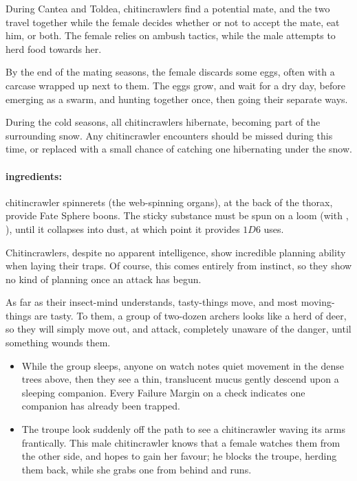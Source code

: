 \begin{multicols}{2}
During \gls{Cantea} and \gls{Toldea}, chitincrawlers find a potential mate, and the two travel together while the female decides whether or not to accept the mate, eat him, or both.
The female relies on ambush tactics, while the male attempts to herd food towards her.

By the end of the mating seasons, the female discards some eggs, often with a carcase wrapped up next to them.
The eggs grow, and wait for a dry day, before emerging as a swarm, and hunting together once, then going their separate ways.

\crawlerSwarm

During the cold seasons, all chitincrawlers hibernate, becoming part of the surrounding snow.
Any chitincrawler encounters should be missed during this time, or replaced with a small chance of catching one hibernating under the snow.

\paragraph{\Glspl{ingredient}:}
chitincrawler spinnerets (the web-spinning organs), at the back of the thorax, provide Fate Sphere \glspl{boon}.
The sticky substance must be spun on a loom (with , \tn[10]), until it collapses into dust, at which point it provides $1D6$ uses.

\showEnc\label{chitin:tactics}
Chitincrawlers, despite no apparent intelligence, show incredible planning ability when laying their traps.
Of course, this comes entirely from instinct, so they show no kind of planning once an attack has begun.

As far as their insect-mind understands, tasty-things move, and most moving-things are tasty.
To them, a group of two-dozen archers looks like a herd of deer, so they will simply move out, and attack, completely unaware of the danger, until something wounds them.

\begin{itemize}
  \item
  While the group sleeps, anyone on watch notes quiet movement in the dense trees above, then they see a thin, translucent mucus gently descend upon a sleeping companion.
  Every Failure Margin on a  check indicates one companion has already been trapped.
  \item
  The troupe look suddenly off the path to see a chitincrawler waving its arms frantically.
  This male chitincrawler knows that a female watches them from the other side, and hopes to gain her favour; he blocks the troupe, herding them back, while she grabs one from behind and runs.


\end{itemize}
\end{multicols}
